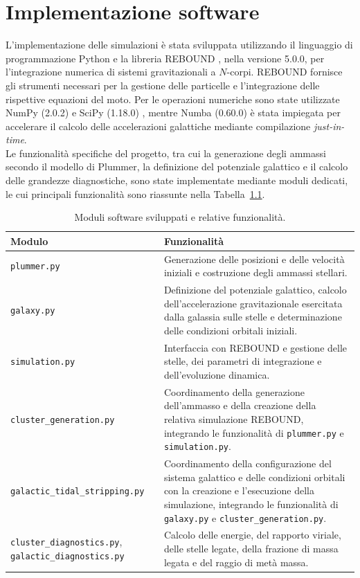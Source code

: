 \chapter{Implementazione software}
\label{cha:implementazione-software}
L'implementazione delle simulazioni è stata sviluppata utilizzando il linguaggio di programmazione Python \cite{vanrossum2009python} e la libreria REBOUND \cite{rein2012rebound}, nella versione 5.0.0, per l'integrazione numerica di sistemi gravitazionali a $N$-corpi. REBOUND fornisce gli strumenti necessari per la gestione delle particelle e l'integrazione delle rispettive equazioni del moto. Per le operazioni numeriche sono state utilizzate NumPy (2.0.2) \cite{harris2020array} e SciPy (1.18.0) \cite{virtanen2020scipy}, mentre Numba (0.60.0) \cite{lam2015numba} è stata impiegata per accelerare il calcolo delle accelerazioni galattiche mediante compilazione \emph{just-in-time}.\\
Le funzionalità specifiche del progetto, tra cui la generazione degli ammassi secondo il modello di Plummer, la definizione del potenziale galattico e il calcolo delle grandezze diagnostiche, sono state implementate mediante moduli dedicati, le cui principali funzionalità sono riassunte nella Tabella~\ref{tab:moduli-software}.
\begin{table}[H]
	\centering
	\small
	\caption{Moduli software sviluppati e relative funzionalità.}
	\label{tab:moduli-software}
	\begin{tabular}{p{}p{}}
		\hline
		\textbf{Modulo} & \textbf{Funzionalità} \\
		\hline
		\texttt{plummer.py} &
		Generazione delle posizioni e delle velocità iniziali e costruzione degli ammassi stellari. \\
		\hline
		\texttt{galaxy.py} &
		Definizione del potenziale galattico, calcolo dell'accelerazione gravitazionale esercitata dalla galassia sulle stelle e determinazione delle condizioni orbitali iniziali. \\
		\hline
		\texttt{simulation.py} &
		Interfaccia con REBOUND e gestione delle stelle, dei parametri di integrazione e dell'evoluzione dinamica. \\
		\hline
		\texttt{cluster\_generation.py} &
		Coordinamento della generazione dell'ammasso e della creazione della relativa simulazione REBOUND, integrando le funzionalità di \texttt{plummer.py} e \texttt{simulation.py}. \\
		\hline
		\texttt{galactic\_tidal\_stripping.py} &
		Coordinamento della configurazione del sistema galattico e delle condizioni orbitali con la creazione e l'esecuzione della simulazione, integrando le funzionalità di \texttt{galaxy.py} e \texttt{cluster\_generation.py}. \\
		\hline
		\texttt{cluster\_diagnostics.py}, \texttt{galactic\_diagnostics.py} &
		Calcolo delle energie, del rapporto viriale, delle stelle legate, della frazione di massa legata e del raggio di metà massa. \\
		\hline
	\end{tabular}
\end{table}
